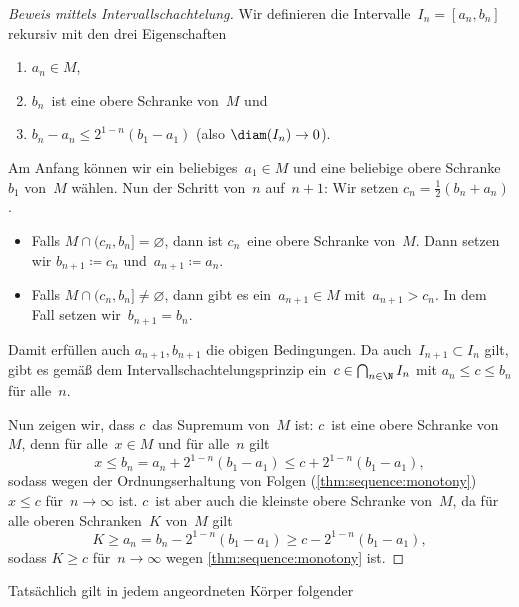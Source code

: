 \documentclass[a4paper]{article}
\begin{document}
\begin{proof}[Beweis mittels Intervallschachtelung]
    Wir definieren die Intervalle~$I_n = [a_n, b_n]$ rekursiv mit den drei Eigenschaften
    \begin{enumerate}
        \item $a_n \in M$,
        \item $b_n$~ist eine obere Schranke von~$M$ und
        \item $b_n - a_n \leq 2^{1-n} (b_1 - a_1)$ (also $\diam(I_n) \to 0$).
    \end{enumerate}

    Am Anfang können wir ein beliebiges~$a_1 \in M$ und eine beliebige obere Schranke~$b_1$ von~$M$ wählen. Nun der Schritt von~$n$ auf~$n+1$: Wir setzen $c_n = \frac{1}{2}(b_n + a_n)$.
    \begin{itemize}
        \item Falls $M \cap (c_n, b_n] = \varnothing$, dann ist $c_n$~eine obere Schranke von~$M$. Dann setzen wir $b_{n+1} \coloneqq c_n$ und~$a_{n+1} \coloneqq a_n$.
        \item Falls $M \cap (c_n, b_n] \neq \varnothing$, dann gibt es ein~$a_{n+1} \in M$ mit~$a_{n+1} > c_n$. In dem Fall setzen wir~$b_{n+1} = b_n$.
    \end{itemize}
    Damit erfüllen auch $a_{n+1}, b_{n+1}$ die obigen Bedingungen. Da auch~$I_{n+1} \subset I_n$ gilt, gibt es gemäß dem Intervallschachtelungsprinzip ein~$c \in \bigcap_{n\in\N} I_n$ mit $a_n \leq c \leq b_n$ für alle~$n$.

    Nun zeigen wir, dass $c$~das Supremum von~$M$ ist: $c$~ist eine obere Schranke von~$M$, denn für alle~$x \in M$ und für alle~$n$ gilt
    \begin{equation*}
        x \leq b_n = a_n + 2^{1-n} (b_1-a_1) \leq c + 2^{1-n} (b_1-a_1),
    \end{equation*}
    sodass wegen der Ordnungserhaltung von Folgen (\cref{thm:sequence:monotony}) $x \leq c$ für~$n \to \infty$ ist. $c$~ist aber auch die kleinste obere Schranke von~$M$, da für alle oberen Schranken~$K$ von~$M$ gilt
    \begin{equation*}
        K \geq a_n = b_n - 2^{1-n} (b_1-a_1) \geq c - 2^{1-n} (b_1-a_1),
    \end{equation*}
    sodass $K \geq c$ für~$n \to \infty$ wegen \cref{thm:sequence:monotony} ist.
\end{proof}

Tatsächlich gilt in jedem angeordneten Körper folgender
\end{document}
